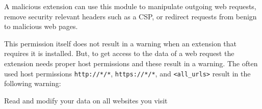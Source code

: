 	A malicious extension can use this module to manipulate outgoing web requests, remove security relevant headers such as a CSP, or redirect requests from benign to malicious web pages.
	
	This permission itself does not result in a warning when an extension that requires it is installed. But, to get access to the data of a web request the extension needs proper host permissions and these result in a warning. The often used host permissions \texttt{http://*/*}, \texttt{https://*/*}, and \texttt{<all\_urls>} result in the following warning:
	\begin{permissionwarning}
		Read and modify your data on all websites you visit 
	\end{permissionwarning}
	
	
		
	

